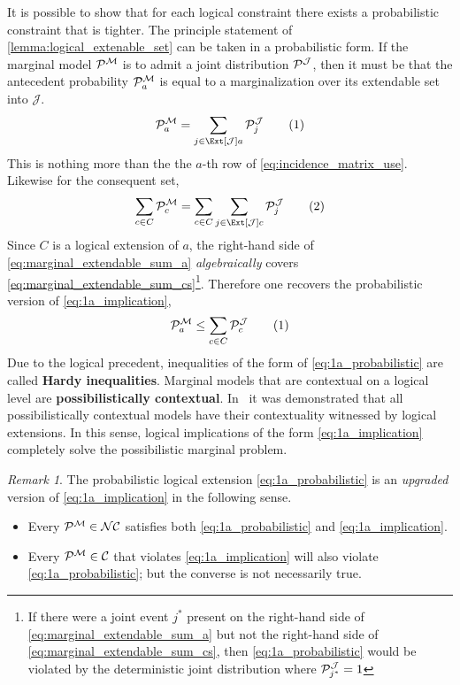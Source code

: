 \documentclass[aps, 10pt, english, twoside, pra, nofootinbib, longbibliography]{revtex4-1}
\theoremstyle{plain}
\theoremstyle{definition}
\theoremstyle{remark}
\newtheorem{remark}[theorem]{Remark}
\newcommand{\mscenario}{\mathcal{M}}
\newcommand{\jointvar}{\mathcal{J}}
\newcommand{\term}[1]{\textcolor{Mahogany}{\textbf{#1}}}
\begin{document}
    It is possible to show that for each logical constraint there exists a probabilistic constraint that is tighter. The principle statement of \cref{lemma:logical_extenable_set} can be taken in a probabilistic form. If the marginal model $\probvec^{\mscenario}$ is to admit a joint distribution $\probvec^{\jointvar}$, then it must be that the antecedent probability $\probvec^{\mscenario}_a$ is equal to a marginalization over its extendable set into $\jointvar$.
    \[ \probvec^{\mscenario}_a = \sum_{j \in \Ext[\jointvar]{a}}\probvec^{\jointvar}_j \eq \label{eq:marginal_extendable_sum_a} \]
    This is nothing more than the the $a$-th row of \cref{eq:incidence_matrix_use}. Likewise for the consequent set,
    \[ \sum_{c \in C}\probvec^{\mscenario}_c = \sum_{c \in C}\sum_{j \in \Ext[\jointvar]{c}}\probvec^{\jointvar}_j \eq \label{eq:marginal_extendable_sum_cs} \]
    Since $C$ is a logical extension of $a$, the right-hand side of \cref{eq:marginal_extendable_sum_a} \textit{algebraically} covers \cref{eq:marginal_extendable_sum_cs}\footnote{If there were a joint event $j^*$ present on the right-hand side of \cref{eq:marginal_extendable_sum_a} but not the right-hand side of \cref{eq:marginal_extendable_sum_cs}, then \cref{eq:1a_probabilistic} would be violated by the deterministic joint distribution where $\probvec^{\jointvar}_{j^*} = 1$}. Therefore one recovers the probabilistic version of \cref{eq:1a_implication},
    \[ \probvec^{\mscenario}_a \leq \sum_{c \in C}\probvec^{\jointvar}_c \eq \label{eq:1a_probabilistic} \]
    Due to the logical precedent, inequalities of the form of \cref{eq:1a_probabilistic} are called \term{Hardy inequalities}. Marginal models that are contextual on a logical level are \term{possibilistically contextual}. In~\cite{Abramsky_2011} it was demonstrated that all possibilistically contextual models have their contextuality witnessed by logical extensions. In this sense, logical implications of the form \cref{eq:1a_implication} completely solve the possibilistic marginal problem.
    \begin{remark}
        The probabilistic logical extension \cref{eq:1a_probabilistic} is an \textit{upgraded} version of \cref{eq:1a_implication} in the following sense.
        \begin{itemize}
            \item Every $\probvec^{\mscenario} \in \s{NC}$ satisfies both \cref{eq:1a_probabilistic} and \cref{eq:1a_implication}.
            \item Every $\probvec^{\mscenario} \in \s{C}$ that violates \cref{eq:1a_implication} will also violate \cref{eq:1a_probabilistic}; but the converse is not necessarily true.
        \end{itemize}
    \end{remark}
\end{document}
